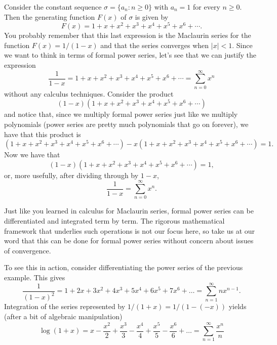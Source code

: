 \begin{example}\label{exam:genfunction:geom-series}
  Consider the constant sequence $\sigma=\{a_n:n\ge0\}$ with $a_n=1$
  for every $n\ge0$.  Then the generating function $F(x)$ of $\sigma$
  is given by
  \[
  F(x)=1+x+x^2+x^3+x^4+x^5+x^6+\cdots.
  \]
  You probably remember that this last expression is the Maclaurin
  series for the function $F(x)=1/(1-x)$ and that the series converges
  when $|x|<1$. Since we want to think in terms of formal power
  series, let's see that we can justify the expression
  \[
  \frac{1}{1-x}=1+x+x^2+x^3+x^4+x^5+x^6+\cdots=\sum_{n=0}^\infty x^n
  \]
  without any calculus techniques. Consider the product
  \[(1-x)(1+x+x^2+x^3+x^4+x^5+x^6+\cdots)\] and notice that, since we
  multiply formal power series just like we multiply polynomials
  (power series are pretty much polynomials that go on forever), we
  have that this product is
  \[(1+x+x^2+x^3+x^4+x^5+x^6+\cdots)-x(1+x+x^2+x^3+x^4+x^5+x^6+\cdots)
  = 1.\]
  Now we have that
  \[(1-x)(1+x+x^2+x^3+x^4+x^5+x^6+\cdots) = 1,\]
  or, more usefully, after dividing through by $1-x$,
  \[\frac{1}{1-x} = \sum_{n=0}^\infty x^n.\]
\end{example}

\begin{example}
  Just like you learned in calculus for Maclaurin series, formal power
  series can be differentiated and integrated
  term by term. The rigorous mathematical framework that underlies
  such operations is not our focus here, so take us at our word that
  this can be done for formal power series without concern about
  issues of convergence.

  To see this in action, consider differentiating the power series of
  the previous example. This gives 
  \[
  \frac{1}{(1-x)^2}=1+2x+3x^2+4x^3+5x^4+6x^5+7x^6+\dots=\sum_{n=1}^\infty nx^{n-1}.
  \]
  Integration of the series represented by $1/(1+x) = 1/(1-(-x))$
  yields (after a bit of algebraic manipulation)
  \[
  \log(1+x)=x-\frac{x^2}{2}+\frac{x^3}{3}-\frac{x^4}{4}+\frac{x^5}{5}-
  \frac{x^6}{6}+\dots=\sum_{n=1}^\infty \frac{x^n}{n}
  \]
\end{example}


